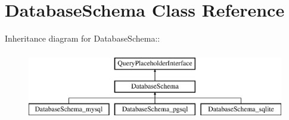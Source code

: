 \hypertarget{classDatabaseSchema}{
\section{DatabaseSchema Class Reference}
\label{classDatabaseSchema}
}
Inheritance diagram for DatabaseSchema::\begin{figure}[H]
\begin{center}
\leavevmode
\includegraphics[height=3cm]{classDatabaseSchema}
\end{center}
\end{figure}
